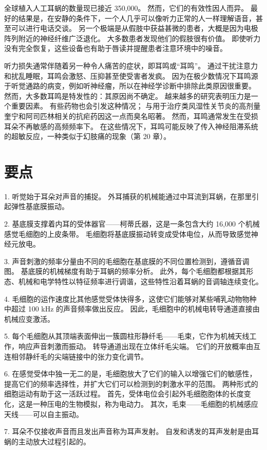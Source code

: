 全球植入人工耳蜗的数量现已接近 350,000。 然而，它们的有效性因人而异。 最好的结果是，在安静的条件下，一个人几乎可以像听力正常的人一样理解语音，甚至可以进行电话交谈。 另一个极端是从假肢中获益甚微的患者，大概是因为电极阵列附近的神经纤维广泛退化。 大多数患者发现他们的假肢很有价值。 即使听力没有完全恢复，这些设备也有助于唇读并提醒患者注意环境中的噪音。

听力损失通常伴随着另一种令人痛苦的症状，即耳鸣或“耳鸣”。 通过干扰注意力和扰乱睡眠，耳鸣会激怒、压抑甚至使受害者发疯。 因为在极少数情况下耳鸣源于听觉通路的病变，例如听神经瘤，所以在神经学诊断中排除此类原因很重要。 然而，大多数耳鸣是特发性的：其原因尚不确定。 越来越多的研究表明压力是一个重要因素。 有些药物也会引发这种情况； 与用于治疗类风湿性关节炎的高剂量奎宁和阿司匹林相关的抗疟药因这一点而臭名昭著。 然而，耳鸣通常发生在受损耳朵不再敏感的高频频率下。 在这些情况下，耳鸣可能反映了传入神经阻滞系统的超敏反应，一种类似于幻肢痛的现象（第 20 章）。


\section{要点}
1. 听觉始于耳朵对声音的捕捉。 外耳捕获的机械能通过中耳流到耳蜗，在那里引起弹性基底膜振动。 

2. 基底膜支撑着内耳的受体器官——柯蒂氏器，这是一条包含大约 16,000 个机械感觉毛细胞的上皮条带。 毛细胞将基底膜振动转变成受体电位，从而导致感觉神经元放电。 

3. 声音刺激的频率分量由不同的毛细胞在基底膜的不同位置检测到，遵循音调图。 基底膜的机械梯度有助于耳蜗的频率分析。 此外，每个毛细胞都根据其形态、机械和电学特性以特征频率进行调谐，这些特性沿着耳蜗的音调轴连续变化。 

4. 毛细胞的运作速度比其他感觉受体快得多，这使它们能够对某些哺乳动物物种中超过 100 kHz 的声音频率做出反应。 因此，毛细胞中的机械电转导通道直接由机械应变激活。 

5. 每个毛细胞从其顶端表面伸出一簇圆柱形静纤毛——毛束，它作为机械天线工作，响应声音刺激而振动。 转导通道出现在立体纤毛尖端。 它们的开放概率由互连相邻静纤毛的尖端链接中的张力变化调节。 

6. 在感觉受体中独一无二的是，毛细胞放大了它们的输入以增强它们的敏感性，提高它们的频率选择性，并扩大它们可以检测到的刺激水平的范围。 两种形式的细胞运动有助于这一活跃过程。 首先，受体电位会引起外毛细胞胞体的长度变化，这是一种压电的生物模拟，称为电动力。 其次，毛束——毛细胞的机械感应天线——可以自主振动。 

7. 耳朵不仅接收声音而且发出声音称为耳声发射。 自发和诱发的耳声发射是由耳蜗的主动放大过程引起的。 

